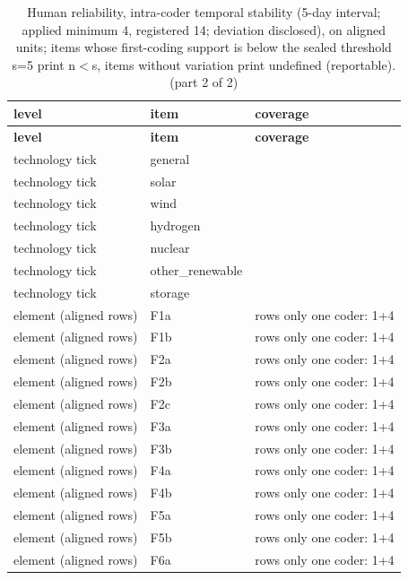 \begingroup\footnotesize
\begin{longtable}{>{\raggedright\arraybackslash}p{158.1pt}>{\raggedright\arraybackslash}p{106.7pt}>{\raggedright\arraybackslash}p{154.1pt}}
\caption{Human reliability, intra-coder temporal stability (5-day interval; applied minimum 4, registered 14; deviation disclosed), on aligned units; items whose first-coding support is below the sealed threshold s=\allowbreak{}5 print n$<$s, items without variation print undefined (reportable). (part 2 of 2)} \\
\toprule
\textbf{level} & \textbf{item} & \textbf{coverage} \\
\midrule
\endfirsthead
\toprule
\textbf{level} & \textbf{item} & \textbf{coverage} \\
\midrule
\endhead
\bottomrule
\endfoot
technology tick & general &  \\
technology tick & solar &  \\
technology tick & wind &  \\
technology tick & hydrogen &  \\
technology tick & nuclear &  \\
technology tick & other\_\allowbreak{}renewable &  \\
technology tick & storage &  \\
element (aligned rows) & F1a & rows only one coder:\allowbreak{} 1+4 \\
element (aligned rows) & F1b & rows only one coder:\allowbreak{} 1+4 \\
element (aligned rows) & F2a & rows only one coder:\allowbreak{} 1+4 \\
element (aligned rows) & F2b & rows only one coder:\allowbreak{} 1+4 \\
element (aligned rows) & F2c & rows only one coder:\allowbreak{} 1+4 \\
element (aligned rows) & F3a & rows only one coder:\allowbreak{} 1+4 \\
element (aligned rows) & F3b & rows only one coder:\allowbreak{} 1+4 \\
element (aligned rows) & F4a & rows only one coder:\allowbreak{} 1+4 \\
element (aligned rows) & F4b & rows only one coder:\allowbreak{} 1+4 \\
element (aligned rows) & F5a & rows only one coder:\allowbreak{} 1+4 \\
element (aligned rows) & F5b & rows only one coder:\allowbreak{} 1+4 \\
element (aligned rows) & F6a & rows only one coder:\allowbreak{} 1+4 \\

\end{longtable}
